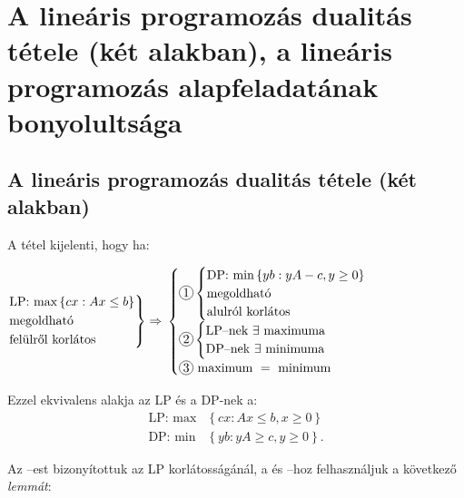 \newpage
\section{A lineáris programozás dualitás tétele (két alakban),
a lineáris programozás alapfeladatának bonyolultsága}

\subsection{A lineáris programozás dualitás tétele (két alakban)}
A tétel kijelenti, hogy ha: 

$ \begin{rcases}
\mbox{LP: max}\left\{cx:Ax \leq b\right\} \\
\mbox{megoldható} \\
\mbox{felülről korlátos}
\end{rcases} \Rightarrow$ $\begin{cases}
\circled{1} \begin{cases}
\mbox{DP: min} \left\{ yb:yA - c, y \geq 0 \right\} \\
	\mbox{megoldható} \\ 
	\mbox{alulról korlátos}  
\end{cases} \\
\circled{2} \begin{cases}
\mbox{LP--nek } \exists \mbox{ maximuma} \\
\mbox{DP--nek } \exists \mbox{ minimuma} 
\end{cases}\\
\circled{3} \mbox{ maximum } = \mbox{ minimum}
\end{cases}$

Ezzel ekvivalens alakja az LP és a DP-nek a:
\begin{align*}
\mbox{LP: max} &\left\{ cx:Ax \leq b, x \geq 0 \right\} \\
\mbox{DP: min} &\left\{ yb:yA \geq c, y \geq 0 \right\}.
\end{align*}

Az --est bizonyítottuk az LP korlátosságánál, a  és 
--hoz felhasználjuk a következő \emph{lemmát}:

